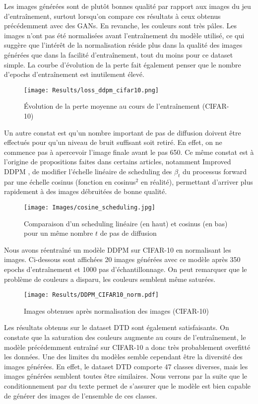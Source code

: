 \documentclass{article}
\begin{document}
Les images générées sont de plutôt bonnes qualité par rapport aux images du jeu d'entraînement, surtout lorsqu'on compare ces résultats à ceux obtenus précédemment avec des GANs. En revanche, les couleurs sont très pâles. Les images n'ont pas été normalisées avant l'entraînement du modèle utilisé, ce qui suggère que l'intérêt de la normalisation réside plus dans la qualité des images générées que dans la facilité d'entraînement, tout du moins pour ce dataset simple. La courbe d'évolution de la perte fait également penser que le nombre d'epochs d'entraînement est inutilement élevé.
\begin{figure}[H]
    \centering
    \texttt{[image: Results/loss\_ddpm\_cifar10.png]}
    \caption{Évolution de la perte moyenne au cours de l'entraînement (CIFAR-10)}
\end{figure}
Un autre constat est qu'un nombre important de pas de diffusion doivent être effectués pour qu'un niveau de bruit suffisant soit retiré. En effet, on ne commence pas à apercevoir l'image finale avant le pas 650. Ce même constat est à l'origine de propositions faites dans certains articles, notamment Improved DDPM \cite{improved_ddpm}, de modifier l'échelle linéaire de scheduling des $\beta_t$ du processus forward par une échelle cosinus (fonction en cosinus$^2$ en réalité), permettant d'arriver plus rapidement à des images débruitées de bonne qualité.
\begin{figure}[H]
    \centering
    \texttt{[image: Images/cosine\_scheduling.jpg]}
    \caption{Comparaison d'un scheduling linéaire (en haut) et cosinus (en bas) pour un même nombre $t$ de pas de diffusion}
\end{figure}

Nous avons réentraîné un modèle DDPM sur CIFAR-10 en normalisant les images. Ci-dessous sont affichées 20 images générées avec ce modèle après 350 epochs d'entraînement et 1000 pas d'échantillonnage. On peut remarquer que le problème de couleurs a disparu, les couleurs semblent même saturées.
\begin{figure}[H]
    \centering
    \texttt{[image: Results/DDPM\_CIFAR10\_norm.pdf]}
    \caption{Images obtenues après normalisation des images (CIFAR-10)}
\end{figure}

Les résultats obtenus sur le dataset DTD sont également satisfaisants. On constate que la saturation des couleurs augmente au cours de l'entraînement, le modèle précédemment entraîné sur CIFAR-10 a donc très probablement overfitté les données. Une des limites du modèles semble cependant être la diversité des images générées. En effet, le dataset DTD comporte 47 classes diverses, mais les images générées semblent toutes être similaires. Nous verrons par la suite que le conditionnement par du texte permet de s'assurer que le modèle est bien capable de générer des images de l'ensemble de ces classes. 
\end{document}
